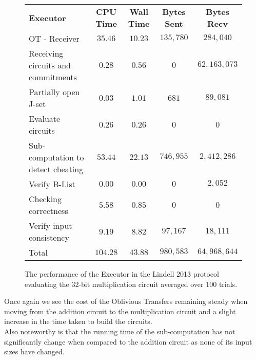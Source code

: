 \documentclass[ %
                    author={Nicholas Tutte},
                supervisor={Prof. Nigel Smart},
                    degree={MEng},
                     title={Secure Two Party Computation},
                  subtitle={A practical comparison of recent protocols},
                      type={Research - GG1K},
                      year={2015} ]{dissertation}
\begin{document}
				\begin{figure}[!ht]
					\begin{tabular}{| p{4.3cm} | c c c c |}
						\hline
						\textbf{Executor} & \textbf{CPU Time} & \textbf{Wall Time} & \textbf{Bytes Sent} & \textbf{Bytes Recv} \\
						\thickhline
						OT - Receiver & $35.46$ & $10.23$ & $135,780$ & $284,040$ \\
						\hline
						Receiving circuits and commitments & $0.28$ & $0.56$ & $0$ & $62,163,073$ \\
						\hline
						Partially open J-set & $0.03$ & $1.01$ & $681$ & $89,081$ \\
						\hline
						Evaluate circuits & $0.26$ & $0.26$ & $0$ & $0$ \\
						\hline
						Sub-computation to detect cheating & $53.44$ & $22.13$ & $746,955$ & $2,412,286$ \\
						\hline
						Verify B-List & $0.00$ & $0.00$ & $0$ & $2,052$ \\
						\hline
						Checking correctness & $5.58$ & $0.85$ & $0$ & $0$ \\
						\hline
						Verify input consistency & $9.19$ & $8.82$ & $97,167$ & $18,111$ \\
						\thickhline
						Total & $104.28$ & $43.88$ & $980,583$ & $64,968,644$ \\
						\hline
					\end{tabular}
					\caption{The performance of the Executor in the Lindell 2013 protocol evaluating the 32-bit multiplication circuit averaged over 100 trials.\label{table:L_2013_Mul_Executor} }
				\end{figure}
				\FloatBarrier

				Once again we see the cost of the Oblivious Transfers remaining steady when moving from the addition circuit to the multiplication circuit and a slight increase in the time taken to build the circuits.\\

				Also noteworthy is that the running time of the sub-computation has not significantly change when compared to the addition circuit as none of its input sizes have changed.\\
\end{document}
